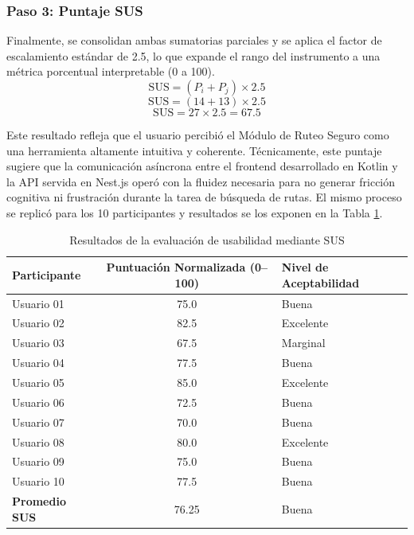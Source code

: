 \subsubsection{Paso 3: Puntaje SUS}
Finalmente, se consolidan ambas sumatorias parciales y se aplica el factor de escalamiento estándar de 2.5, lo que expande el rango del instrumento a una métrica porcentual interpretable (0 a 100).
\begin{equation}
\text{SUS} = (P_{i} + P_{j}) \times 2.5
\end{equation}
\begin{equation}\text{SUS} = (14 + 13) \times 2.5\end{equation}
\begin{equation}\text{SUS} = 27 \times 2.5 = 67.5\end{equation}

Este resultado refleja que el usuario percibió el Módulo de Ruteo Seguro como una herramienta altamente intuitiva y coherente. Técnicamente, este puntaje sugiere que la comunicación asíncrona entre el frontend desarrollado en Kotlin y la API servida en Nest.js operó con la fluidez necesaria para no generar fricción cognitiva ni frustración durante la tarea de búsqueda de rutas. El mismo proceso se replicó para los 10 participantes y resultados se los exponen en la Tabla \ref{tab:resultados_sus}.
\begin{table}[H]
\centering
\caption{Resultados de la evaluación de usabilidad mediante SUS}
\label{tab:resultados_sus}
\begin{tabular}{|l|c|l|}
\hline
\textbf{Participante} & \textbf{Puntuación Normalizada (0--100)} & \textbf{Nivel de Aceptabilidad} \\ \hline

Usuario 01 & 75.0 & Buena \\ \hline
Usuario 02 & 82.5 & Excelente \\ \hline
Usuario 03 & 67.5 & Marginal \\ \hline
Usuario 04 & 77.5 & Buena \\ \hline
Usuario 05 & 85.0 & Excelente \\ \hline
Usuario 06 & 72.5 & Buena \\ \hline
Usuario 07 & 70.0 & Buena \\ \hline
Usuario 08 & 80.0 & Excelente \\ \hline
Usuario 09 & 75.0 & Buena \\ \hline
Usuario 10 & 77.5 & Buena \\ \hline
\textbf{Promedio SUS} & 76.25 & Buena \\ \hline

\end{tabular}
\end{table}

